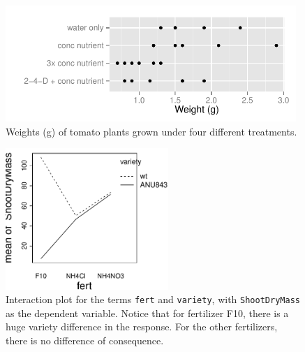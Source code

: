 \documentclass[12pt, a4paper,  BCOR=8.25mm, DIV=15]{scrartcl}\usepackage[]{graphicx}\usepackage[]{color}
\newenvironment{knitrout}{}{} %
\newcommand{\txtt}[1]{{\texttt{#1}}}
\begin{document}
\begin{figure}
\vspace*{-6pt}
\begin{knitrout}
\color{fgcolor}

{\centering \includegraphics[width=0.98\textwidth]{figs/glm-fig5_7e-1} 

}



\end{knitrout}
\caption{Weights (g) of tomato plants grown under four different
  treatments.\label{fig:Tomato}}
\end{figure}

\begin{figure}
\begin{knitrout}
\color{fgcolor}

{\centering \includegraphics[width=0.55\textwidth]{figs/glm-fig5_8e-1} 

}



\end{knitrout}
    \caption{Interaction plot for the terms \txtt{fert} and
      \txtt{variety}, with \txtt{ShootDryMass} as the dependent
      variable. Notice that for fertilizer F10, there is a huge
      variety difference in the response. For the other fertilizers,
      there is no difference of consequence.\label{fig:rice-interact}}
\end{figure}
\end{document}
